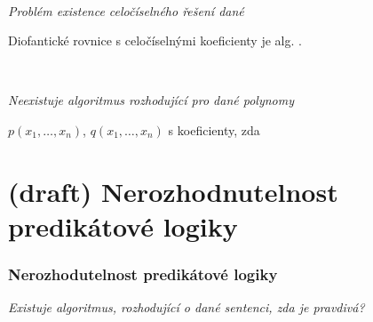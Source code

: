     \smallskip
    
     \ \ {\it Problém existence celočíselného řešení dané
    \smallskip
    
    Diofantické rovnice s celočíselnými koeficienty je alg. .}
    \medskip
    
    \smallskip
    
    {\bf {}}\ \ {\it Neexistuje algoritmus rozhodující pro dané polynomy
    \smallskip
    
    $p(x_1,\dots,x_n)$, $q(x_1,\dots,x_n)$ s  koeficienty, zda}
    
    
    
    

\section{(draft) Nerozhodnutelnost predikátové logiky}\todo

\subsubsection*{Nerozhodutelnost predikátové logiky}
{\it Existuje algoritmus, rozhodující o dané sentenci, zda je  pravdivá?} %
\smallskip

